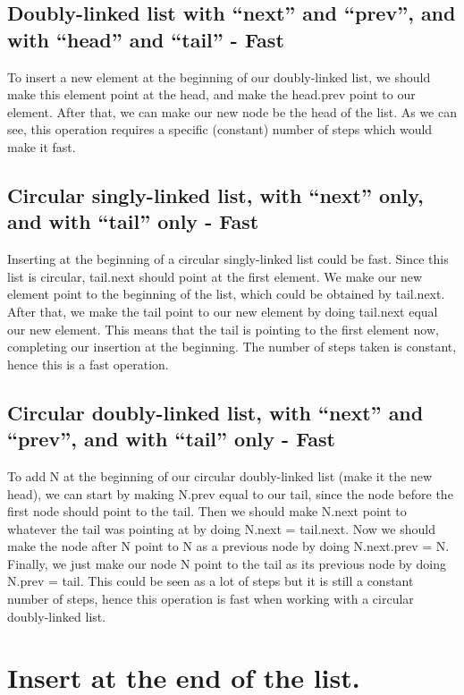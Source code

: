 \documentclass{article}
\begin{document}
\subsection{Doubly-linked list with “next” and “prev”, and with “head” and “tail” - Fast}
To insert a new element at the beginning of our doubly-linked list, we should make this element point at the head, and make the head.prev point to our element. After that, we can make our new node be the head of the list. As we can see, this operation requires a specific (constant) number of steps which would make it fast.

\subsection{Circular singly-linked list, with “next” only, and with “tail” only - Fast}
Inserting at the beginning of a circular singly-linked list could be fast. Since this list is circular, tail.next should point at the first element. We make our new element point to the beginning of the list, which could be obtained by tail.next. After that, we make the tail point to our new element by doing tail.next equal our new element. This means that the tail is pointing to the first element now, completing our insertion at the beginning. The number of steps taken is constant, hence this is a fast operation.

\subsection{Circular doubly-linked list, with “next” and “prev”, and with “tail” only - Fast}
To add N at the beginning of our circular doubly-linked list (make it the new head), we can start by making N.prev equal to our tail, since the node before the first node should point to the tail. Then we should make N.next point to whatever the tail was pointing at by doing N.next = tail.next. Now we should make the node after N point to N as a previous node by doing N.next.prev = N. Finally, we just make our node N point to the tail as its previous node by doing N.prev = tail. This could be seen as a lot of steps but it is still a constant number of steps, hence this operation is fast when working with a circular doubly-linked list.



\section{Insert at the end of the list.}
\end{document}

